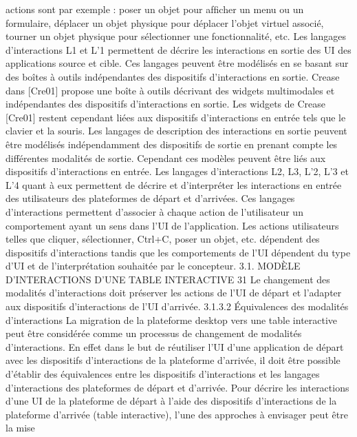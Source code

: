 \documentclass{article}
\begin{document}
actions sont par exemple : poser un objet pour afﬁcher un menu ou un formulaire, d\'{e}placer un
objet physique pour d\'{e}placer l’objet virtuel associ\'{e}, tourner un objet physique pour s\'{e}lectionner
une fonctionnalit\'{e}, etc.
Les langages d’interactions L1 et L’1 permettent de d\'{e}crire les interactions en sortie des UI des
applications source et cible. Ces langages peuvent \^{e}tre mod\'{e}lis\'{e}s en se basant sur des bo\^{i}tes \`{a} outils
ind\'{e}pendantes des dispositifs d’interactions en sortie. Crease dans [Cre01] propose une bo\^{i}te \`{a} outils d\'{e}crivant des widgets multimodales et ind\'{e}pendantes des dispositifs d’interactions en sortie. Les
widgets de Crease [Cre01] restent cependant li\'{e}es aux dispositifs d’interactions en entr\'{e}e tels que le
clavier et la souris. Les langages de description des interactions en sortie peuvent \^{e}tre mod\'{e}lis\'{e}s ind\'{e}pendamment des dispositifs de sortie en prenant compte les diff\'{e}rentes modalit\'{e}s de sortie. Cependant
ces mod\`{e}les peuvent \^{e}tre li\'{e}s aux dispositifs d’interactions en entr\'{e}e.
Les langages d’interactions L2, L3, L’2, L’3 et L’4 quant \`{a} eux permettent de d\'{e}crire et d’interpr\'{e}ter les interactions en entr\'{e}e des utilisateurs des plateformes de d\'{e}part et d’arriv\'{e}es. Ces langages
d’interactions permettent d’associer \`{a} chaque action de l’utilisateur un comportement ayant un sens
dans l’UI de l’application. Les actions utilisateurs telles que cliquer, s\'{e}lectionner, Ctrl+C, poser un
objet, etc. d\'{e}pendent des dispositifs d’interactions tandis que les comportements de l’UI d\'{e}pendent du
type d’UI et de l’interpr\'{e}tation souhait\'{e}e par le concepteur.
3.1. MODÈLE D’INTERACTIONS D’UNE TABLE INTERACTIVE
31
Le changement des modalit\'{e}s d’interactions doit pr\'{e}server les actions de l’UI de d\'{e}part et
l’adapter aux dispositifs d’interactions de l’UI d’arriv\'{e}e.
3.1.3.2
Équivalences des modalit\'{e}s d’interactions
La migration de la plateforme desktop vers une table interactive peut \^{e}tre consid\'{e}r\'{e}e comme un
processus de changement de modalit\'{e}s d’interactions. En effet dans le but de r\'{e}utiliser l’UI d’une
application de d\'{e}part avec les dispositifs d’interactions de la plateforme d’arriv\'{e}e, il doit \^{e}tre possible d’\'{e}tablir des \'{e}quivalences entre les dispositifs d’interactions et les langages d’interactions des
plateformes de d\'{e}part et d’arriv\'{e}e.
Pour d\'{e}crire les interactions d’une UI de la plateforme de d\'{e}part \`{a} l’aide des dispositifs d’interactions de la plateforme d’arriv\'{e}e (table interactive), l’une des approches \`{a} envisager peut \^{e}tre la mise
\end{document}
